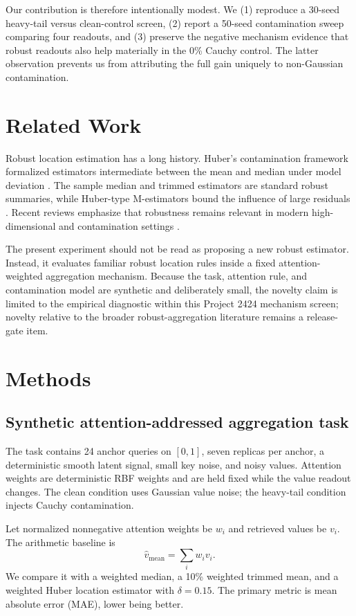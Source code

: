 \documentclass[10pt]{article}
\begin{document}
Our contribution is therefore intentionally modest. We (1) reproduce a 30-seed heavy-tail versus clean-control screen, (2) report a 50-seed contamination sweep comparing four readouts, and (3) preserve the negative mechanism evidence that robust readouts also help materially in the 0\% Cauchy control. The latter observation prevents us from attributing the full gain uniquely to non-Gaussian contamination.

\section{Related Work}
Robust location estimation has a long history. Huber's contamination framework formalized estimators intermediate between the mean and median under model deviation \cite{huber1964}. The sample median and trimmed estimators are standard robust summaries, while Huber-type M-estimators bound the influence of large residuals \cite{rousseeuw1991}. Recent reviews emphasize that robustness remains relevant in modern high-dimensional and contamination settings \cite{loh2025}.

The present experiment should not be read as proposing a new robust estimator. Instead, it evaluates familiar robust location rules inside a fixed attention-weighted aggregation mechanism. Because the task, attention rule, and contamination model are synthetic and deliberately small, the novelty claim is limited to the empirical diagnostic within this Project 2424 mechanism screen; novelty relative to the broader robust-aggregation literature remains a release-gate item.

\section{Methods}
\subsection{Synthetic attention-addressed aggregation task}
The task contains 24 anchor queries on $[0,1]$, seven replicas per anchor, a deterministic smooth latent signal, small key noise, and noisy values. Attention weights are deterministic RBF weights and are held fixed while the value readout changes. The clean condition uses Gaussian value noise; the heavy-tail condition injects Cauchy contamination.

Let normalized nonnegative attention weights be $w_i$ and retrieved values be $v_i$. The arithmetic baseline is
\begin{equation}
\hat{v}_{\mathrm{mean}} = \sum_i w_i v_i.
\end{equation}
We compare it with a weighted median, a 10\% weighted trimmed mean, and a weighted Huber location estimator with $\delta=0.15$. The primary metric is mean absolute error (MAE), lower being better.
\end{document}
